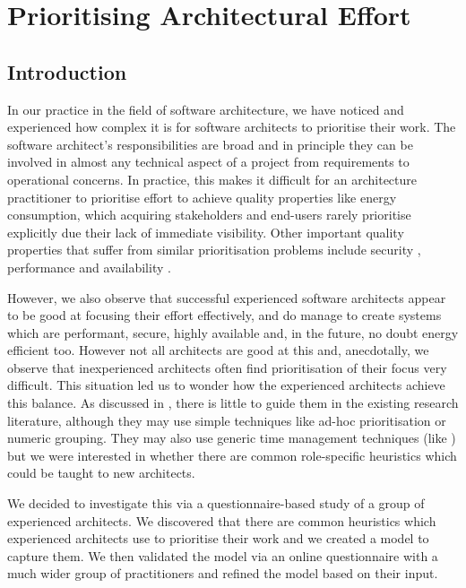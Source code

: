 \chapter{Prioritising Architectural Effort}
\label{chapter:prioritisation}

\section{Introduction}

In our practice in the field of software architecture, we have noticed and experienced how complex it is for software architects to prioritise their work.  The software architect's responsibilities are broad and in principle they can be involved in almost any technical aspect of a project from requirements to operational concerns.  In practice, this makes it difficult for an architecture practitioner to prioritise effort to achieve quality properties like energy consumption, which acquiring stakeholders and end-users rarely prioritise explicitly due their lack of immediate visibility.  Other important quality properties that suffer from similar prioritisation problems include security \cite{cisco2016-uksecprioritisation}, performance and availability \cite{ozkaya2008-qualityproperties}. 

However, we also observe that successful experienced software architects appear to be good at focusing their effort effectively, and do manage to create systems which are performant, secure, highly available and, in the future, no doubt energy efficient too. However not all architects are good at this and, anecdotally, we observe that inexperienced architects often find prioritisation of their focus very difficult.  This situation led us to wonder how the experienced architects achieve this balance.  As discussed in , there is little to guide them in the existing research literature, although they may use simple techniques like ad-hoc prioritisation or numeric grouping.  They may also use generic time management techniques (like \cite{allen2015-gettingthingsdone}) but we were interested in whether there are common role-specific heuristics which could be taught to new architects.

We decided to investigate this via a questionnaire-based study of a group of experienced architects.  We discovered that there are common heuristics which experienced architects use to prioritise their work and we created a model to capture them.  We then validated the model via an online questionnaire with a much wider group of practitioners and refined the model based on their input.

